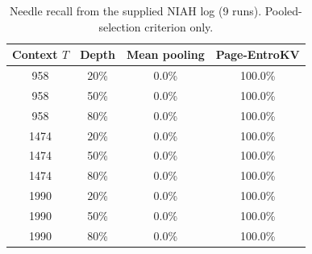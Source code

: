 \begin{table}[t]
\centering\small
\caption{Needle recall from the supplied NIAH log (9 runs). Pooled-selection criterion only.}
\label{tab:niah_results}
\begin{tabular}{@{}cccc@{}}
\toprule
Context $T$ & Depth & Mean pooling & Page-EntroKV \\
\midrule
958 & 20\% & 0.0\% & 100.0\% \\
958 & 50\% & 0.0\% & 100.0\% \\
958 & 80\% & 0.0\% & 100.0\% \\
1474 & 20\% & 0.0\% & 100.0\% \\
1474 & 50\% & 0.0\% & 100.0\% \\
1474 & 80\% & 0.0\% & 100.0\% \\
1990 & 20\% & 0.0\% & 100.0\% \\
1990 & 50\% & 0.0\% & 100.0\% \\
1990 & 80\% & 0.0\% & 100.0\% \\
\bottomrule
\end{tabular}
\end{table}
